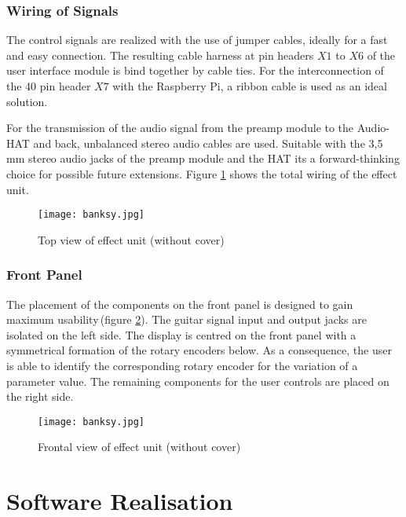 \subsubsection{Wiring of Signals}

The control signals are realized with the use of jumper cables, ideally for a fast and easy connection.
The resulting cable harness at pin headers $X1$ to $X6$ of the user interface module is bind together by cable ties. For the interconnection of the 40 pin header $X7$ with the Raspberry Pi, a ribbon cable is used as an ideal solution.

For the transmission of the audio signal from the preamp module to the Audio-HAT and back, unbalanced stereo audio cables are used. Suitable with the 3,5\,mm stereo audio jacks of the preamp module and the HAT its a forward-thinking choice for possible future extensions.
Figure \ref{fig:Unit_Inner} shows the total wiring of the effect unit.

\begin{figure}[H]
	\centering \texttt{[image: banksy.jpg]}
	\caption[Unit_Inner]{Top view of effect unit (without cover)}
	\label{fig:Unit_Inner}
\end{figure}

\subsubsection{Front Panel}
The placement of the components on the front panel is designed to gain maximum usability\,(figure \ref{fig:Unit_Front}).
The guitar signal input and output jacks are isolated on the left side. The display is centred on the front panel with a symmetrical formation of the rotary encoders below. As a consequence, the user is able to identify the corresponding rotary encoder for the variation of a parameter value.
The remaining components for the user controls are placed on the right side.

\begin{figure}[H]
	\centering \texttt{[image: banksy.jpg]}
	\caption[Unit_Front]{Frontal view of effect unit (without cover)}
	\label{fig:Unit_Front}
\end{figure}





\section{Software Realisation}

